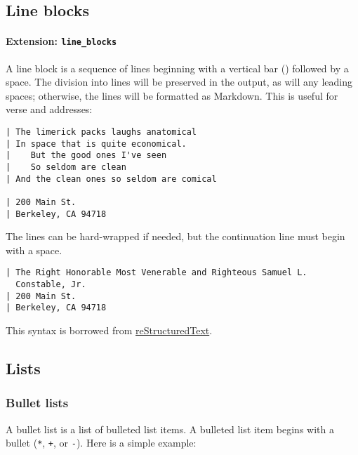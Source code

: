 \documentclass[]{article}
\begin{document}
\hypertarget{line-blocks}{%
\subsection{Line blocks}\label{line-blocks}}

\hypertarget{extension-line_blocks}{%
\paragraph{\texorpdfstring{Extension:
\texttt{line\_blocks}}{Extension: line\_blocks}}\label{extension-line_blocks}}

A line block is a sequence of lines beginning with a vertical bar
(\texttt{\textbar{}}) followed by a space. The division into lines will
be preserved in the output, as will any leading spaces; otherwise, the
lines will be formatted as Markdown. This is useful for verse and
addresses:

\begin{verbatim}
| The limerick packs laughs anatomical
| In space that is quite economical.
|    But the good ones I've seen
|    So seldom are clean
| And the clean ones so seldom are comical

| 200 Main St.
| Berkeley, CA 94718
\end{verbatim}

The lines can be hard-wrapped if needed, but the continuation line must
begin with a space.

\begin{verbatim}
| The Right Honorable Most Venerable and Righteous Samuel L.
  Constable, Jr.
| 200 Main St.
| Berkeley, CA 94718
\end{verbatim}

This syntax is borrowed from
\href{https://docutils.sourceforge.io/docs/ref/rst/introduction.html}{reStructuredText}.

\hypertarget{lists}{%
\subsection{Lists}\label{lists}}

\hypertarget{bullet-lists}{%
\subsubsection{Bullet lists}\label{bullet-lists}}

A bullet list is a list of bulleted list items. A bulleted list item
begins with a bullet (\texttt{*}, \texttt{+}, or \texttt{-}). Here is a
simple example:
\end{document}
